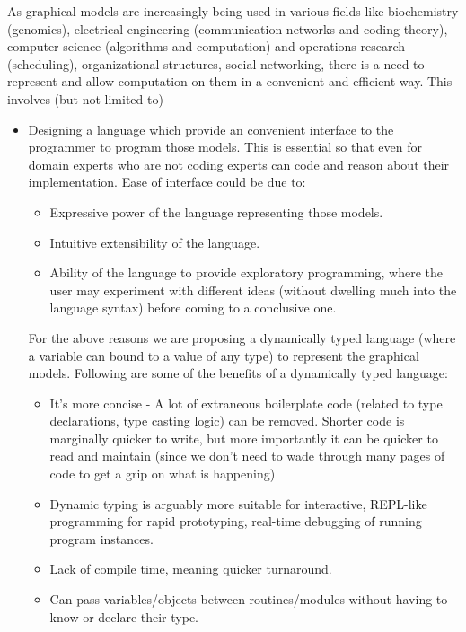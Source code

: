 As graphical models are increasingly being used in various fields like
biochemistry (genomics), electrical engineering (communication networks and
    coding theory), computer science (algorithms and computation) and
operations research (scheduling), organizational structures, social networking,
           there is a need to represent and allow computation on them in a
convenient and efficient way. This involves (but not limited to)

    \begin{itemize} 
    \item Designing a language which provide an convenient
    interface to the programmer to program those models.  This is essential so
    that even for domain experts who are not coding experts can code and reason
    about their implementation.  Ease of interface could be due to:
      \begin{itemize} 
        \item Expressive power of the language representing those
    models.  
        \item Intuitive extensibility of the language.  
        \item Ability of the language to provide exploratory programming, 
        where the user may
    experiment with different ideas (without dwelling much into the language
        syntax) before coming to a conclusive one.  
      \end{itemize} 

      For the above reasons we are proposing a dynamically typed language (where 
      a variable can bound to a value of any type)
      to represent the graphical models.
        Following are some of the 
        benefits of a dynamically typed language:
        \begin{itemize}
          \item It's more concise - A lot of extraneous boilerplate code 
          (related to type declarations, type casting logic) can be 
          removed.  Shorter code is marginally quicker to write, but more 
          importantly it can be quicker to read and maintain 
          (since we don't need to wade through many pages of code 
           to get a grip on what is happening)
          \item Dynamic typing is arguably more suitable for interactive, 
          REPL-like programming for rapid prototyping, real-time debugging of running program instances.
          \item Lack of compile time, meaning quicker turnaround.
          \item Can pass variables/objects between routines/modules without 
          having to know or declare their type.
        \end{itemize}


\end{itemize}
